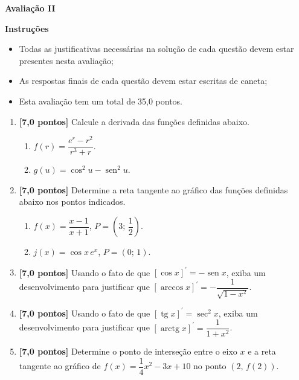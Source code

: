 \documentclass[12pt,a4paper]{article}
\DeclareMathOperator{\sen}{sen}
\DeclareMathOperator{\tg}{tg}
\DeclareMathOperator{\arctg}{arctg}
\begin{document}
\begin{center}
 \textbf{Avaliação II}
\end{center}

\textbf{Instruções}
\begin{itemize}
 \item Todas as justificativas necessárias na solução de cada questão devem estar presentes nesta avaliação;
 \item As respostas finais de cada questão devem estar escritas de caneta;
 \item Esta avaliação tem um total de 35,0 pontos.
\end{itemize}

\begin{enumerate}
 \item \textbf{[7,0 pontos]} Calcule a derivada das funções definidas abaixo.

 \begin{enumerate}
  \item $f(r) = \dfrac{e^r - r^2}{r^3 + r}$.
  \item $g(u) = \cos^2 u - \sen^2 u$.
 \end{enumerate}

 \item \textbf{[7,0 pontos]} Determine a reta tangente ao gráfico das funções definidas abaixo nos pontos indicados.

 \begin{enumerate}
  \item $f(x) = \dfrac{x - 1}{x + 1}$, $P=\left(3;\, \dfrac{1}{2}\right)$.
  \item $j(x) = \cos x\,e^x$, $P=\left(0;\, 1\right)$.
 \end{enumerate}
   
  \item \textbf{[7,0 pontos]} Usando o fato de que $[\cos x]^\prime = -\sen x$, exiba um desenvolvimento para justificar que 
$[\arccos x]^\prime = -\dfrac{1}{\sqrt{1 - x^2}}$.

  \item \textbf{[7,0 pontos]} Usando o fato de que $[\tg x]^\prime = \sec^2 x$, exiba um desenvolvimento para justificar que 
$[\arctg x]^\prime = \dfrac{1}{1 + x^2}$.
 
  \item \textbf{[7,0 pontos]} Determine o ponto de interseção entre o eixo $x$ e a reta tangente ao gráfico de 
  $f(x)=\dfrac{1}{4}x^{2} -3x + 10$ no ponto $(2,\, f(2))$.

  \end{enumerate}
\end{document}

